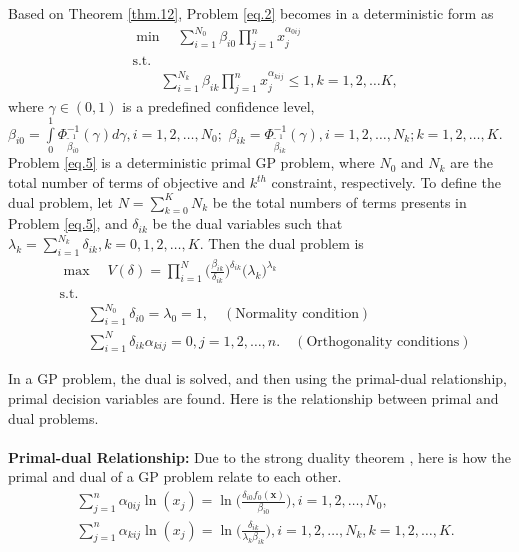 \par Based on Theorem \ref{thm.12}, Problem \ref{eq.2} becomes in a deterministic form as
\begin{equation}\label{eq.5}
	\begin{aligned}
		&	\min \quad \sum\limits_{i=1}^{N_0}\beta_{i0}\prod\limits_{j=1}^{n}x_j^{\alpha_{0ij}}\\
		&	\text{s.t.}\\
		& \qquad \sum\limits_{i=1}^{N_k}\beta_{ik}\prod\limits_{j=1}^{n}x_j^{\alpha_{kij}}\leq 1,k=1,2,\ldots K,
	\end{aligned}
\end{equation} 
where $\gamma\in (0,1)$ is a predefined confidence level, $\beta_{i0}=\int\limits_{0}^{1}\Phi_{\tilde{\beta}_{i0}^1}^{-1}(\gamma)d\gamma,i=1,2,\ldots, N_0;$ $\beta_{ik}=\Phi_{\tilde{\beta}_{ik}^1}^{-1}(\gamma),i=1,2,\ldots,N_k;k=1,2,\ldots,K.$ Problem \ref{eq.5} is a deterministic primal GP problem, where $N_0$ and $N_k$ are the total number of terms of objective and $k^{th}$ constraint, respectively. To define the dual problem, let $N=\sum\limits_{k=0}^{K}N_k$ be the total numbers of terms presents in Problem \ref{eq.5}, and $\delta_{ik}$ be the dual variables such that $\lambda_k=\sum\limits_{i=1}^{N_k}{\delta_{ik}},k=0,1,2,\ldots,K.$ Then the dual problem is 
\begin{equation}\label{eq.6}
	\begin{aligned}
		&\max \quad V(\delta)=\prod_{i=1}^{N}\bigg(\frac{\beta_{ik}}{{\delta_{ik}}}\bigg)^{{\delta_{ik}}}\bigg(\lambda_k\bigg)^{\lambda_k}\\
		&\text{s.t.}\\
		& \qquad \sum\limits_{i=1}^{N_0}{\delta_{i0}}=\lambda_0=1, \quad (\text{Normality condition})\\
		&\qquad\sum\limits_{i=1}^{N}{\delta_{ik}}{\alpha_{kij}}=0,j=1,2,\ldots,n. \quad (\text{Orthogonality conditions})
	\end{aligned}
\end{equation}
\par In a GP problem, the dual is solved, and then using the primal-dual relationship, primal decision variables are found. Here is the relationship between primal and dual problems.\\\\
\textbf{Primal-dual Relationship:} 
Due to the strong duality theorem \cite{Duffin 1967,Duffin 1973}, here is how the primal and dual of a GP problem relate to each other. 
\begin{equation}\label{eq.7}
	\begin{aligned}
		&\sum\limits_{j=1}^n{\alpha_{0ij} } \ln(x_j)=\ln \bigg(\frac{{\delta_{i0}}f_0(\textbf{x}) }{\beta_{i0}}\bigg), i=1,2,\ldots,N_{0},\\
		&\sum\limits_{j=1}^n{\alpha_{kij} } \ln(x_j)=\ln \bigg(\frac{\delta_{ik}} { \lambda_k \beta_{ik}}\bigg),i=1,2,\ldots,N_{k},k=1,2,\ldots,K.
	\end{aligned}
\end{equation}
